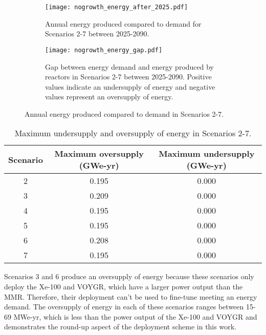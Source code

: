 \begin{figure}[h!]
    \centering
    \begin{subfigure}{0.45\textwidth}
        \centering
        \texttt{[image: nogrowth\_energy\_after\_2025.pdf]}
        \caption{Annual energy produced compared to demand for Scenarios 2-7
        between 2025-2090.}
        \label{fig:nogrowth_energy_after_2025}
    \end{subfigure}
    \hfill
    \begin{subfigure}{0.45\textwidth}
        \centering
        \texttt{[image: nogrowth\_energy\_gap.pdf]}
        \caption{Gap between energy demand and energy produced by reactors 
        in Scenarios 2-7 between 2025-2090. Positive values indicate an 
        undersupply of energy and negative values represent an 
        oversupply of energy.}
        \label{fig:nogrowth_energy_gap}
    \end{subfigure}
       \caption{Annual energy produced compared to demand in Scenarios 2-7.}
       \label{fig:nogrowth_energy}
\end{figure}

\begin{table}[h!]
    \centering
    \caption{Maximum undersupply and oversupply of energy in Scenarios 2-7.}
    \label{tab:nogrowth_energy}
    \begin{tabular}{c c c}
        \hline 
        Scenario & Maximum oversupply (GWe-yr) & Maximum undersupply (GWe-yr) \\
        \hline 
        2 & 0.195 & 0.000 \\
        3 & 0.209 & 0.000 \\
        4 & 0.195 & 0.000 \\
        5 & 0.195 & 0.000 \\
        6 & 0.208 & 0.000 \\
        7 & 0.195 & 0.000 \\
        \hline
        
    \end{tabular}
\end{table}

Scenarios 3 and 6 produce an 
oversupply of energy because these scenarios only deploy the Xe-100 and VOYGR,
which have a larger power output than the \gls{MMR}. Therefore,
their deployment can't be used to fine-tune meeting an energy demand. The oversupply 
of energy in each of these scenarios ranges between 15-69 MWe-yr, which is less 
than the power output of the Xe-100 and VOYGR and demonstrates the round-up 
aspect of the deployment scheme in this work. 

